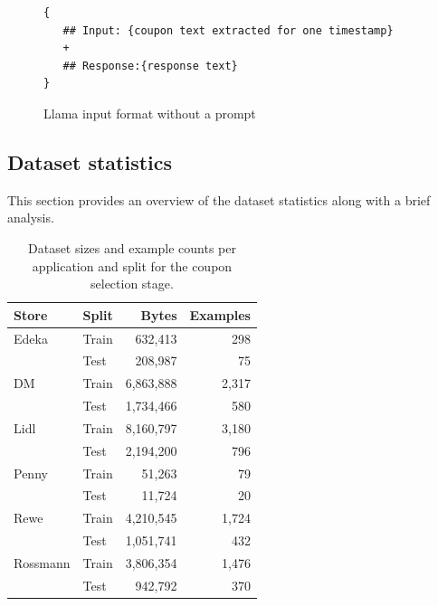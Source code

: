\documentclass[licencjacka,en]{pracamgr}
\begin{document}
\begin{figure}[h]
\centering
\begin{tcolorbox}[sharp corners, boxrule=0.5mm, colframe=black, colback=white, coltitle=black, width=0.9\textwidth] 
\begin{BVerbatim}
{
   ## Input: {coupon text extracted for one timestamp}
   +
   ## Response:{response text}
}
\end{BVerbatim}
\end{tcolorbox}
\caption{Llama input format without a prompt}
\label{fig:llama_ds_wth}
\end{figure}

\subsection{Dataset statistics}
This section provides an overview of the dataset statistics along with a brief analysis.

\begin{table}[h!]
\centering
\begin{tabular}{|l|l|r|r|}
\hline
\textbf{Store} & \textbf{Split} & \textbf{Bytes} & \textbf{Examples} \\
\hline
Edeka     & Train & 632,413  & 298 \\
          & Test  & 208,987  & 75 \\
DM        & Train & 6,863,888 & 2,317 \\
          & Test  & 1,734,466 & 580 \\
Lidl      & Train & 8,160,797 & 3,180 \\
          & Test  & 2,194,200 & 796 \\
Penny     & Train & 51,263   & 79 \\
          & Test  & 11,724   & 20 \\
Rewe      & Train & 4,210,545 & 1,724 \\
          & Test  & 1,051,741 & 432 \\
Rossmann  & Train & 3,806,354 & 1,476 \\
          & Test  & 942,792  & 370 \\
\hline
\end{tabular}
\caption{Dataset sizes and example counts per application and split for the coupon selection stage.}
\end{table}
\end{document}
